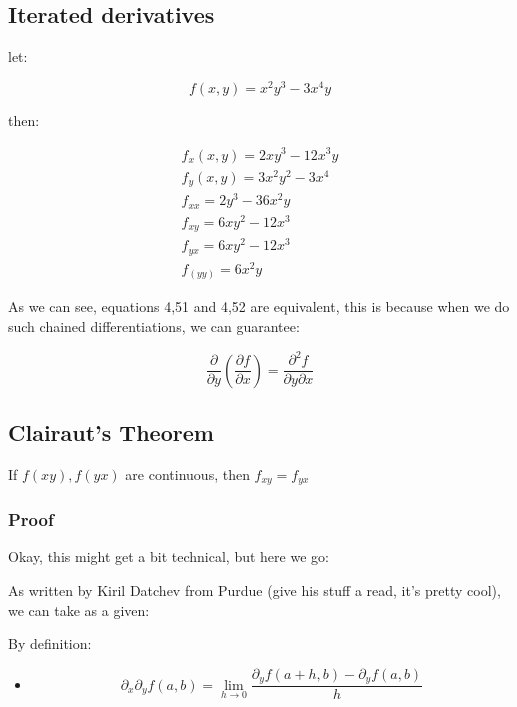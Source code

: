 \documentclass[11pt,fleqn]{book} %
\begin{document}
\subsection{Iterated derivatives}
let:

\begin{equation}
    f(x,y) = x^2 y^3 - 3x^4 y
 \end{equation}

then:

\begin{gather}
    f_x(x,y) = 2xy^3 - 12x^3 y \\
    f_y(x,y) = 3x^2 y^2 - 3x^4 \\
    f_{xx} = 2y^3 - 36x^2y \\
    f_{xy} = 6xy^2 - 12x^3 \\
    f_{yx} = 6xy^2 - 12x^3 \\
    f_(yy) = 6x^2y
\end{gather}

As we can see, equations 4,51 and 4,52 are equivalent, this is because when we do
such chained differentiations, we can guarantee:

\begin{equation}
    \frac{\partial}{\partial y} (\frac{\partial f }{\partial x}) = \frac{\partial^2 f}{\partial y \partial x}
\end{equation}

\subsection{Clairaut's Theorem}

If $ f(xy), f(yx) $ are continuous, then $f_{xy} = f_{yx}$ 

\subsubsection*{Proof}

Okay, this might get a bit technical, but here we go:

As written by Kiril Datchev from Purdue\cite[]{} (give his stuff a read, it's pretty cool), we can take as a given:

By definition:
\begin{itemize}
    \item \begin{equation}
        \partial_x \partial_y f(a,b) = \lim_{h \to 0} \frac{\partial_y f(a + h, b) - \partial_y f(a,b)}{h}
    \end{equation}
\end{itemize}
\end{document}
